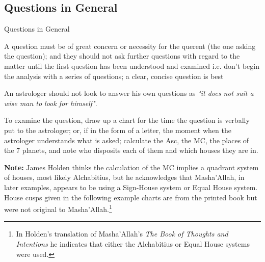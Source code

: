 \subsection{Questions in General}
\begin{frame}[t]{Questions in General}

A question must be of great concern or necessity for the querent (the one asking the question); and they should not ask further questions with regard to the matter until the first question has been understood and examined i.e. don't begin the analysis with a series of questions; a clear, concise question is best

An astrologer should not look to answer his own questions as \textsl{"it does not suit a wise man to look for himself"}. 

To examine the question, draw up a chart for the time the question is verbally put to the astrologer; or, if in the form of a letter, the moment when the astrologer understands what is asked; calculate the Asc, the MC, the places of the 7 planets, and note who disposits each of them and which houses they are in.
\vspace{0.5cm}
\begin{mdframed}[backgroundcolor=gray!5, rightmargin=2em, leftmargin=2em]
\small
\textbf{Note:} James Holden thinks the calculation of the MC implies a quadrant system of houses, most likely Alchabitius, but he acknowledges that Masha'Allah, in later examples, appears to be using a Sign-House system or Equal House system. House cusps given in the following example charts are from the printed book but were not original to Masha'Allah.\footnote{In Holden's translation of Masha'Allah's \textsl{The Book of Thoughts and Intentions} he indicates that either the Alchabitius or Equal House systems were used.}
\end{mdframed}

\end{frame}